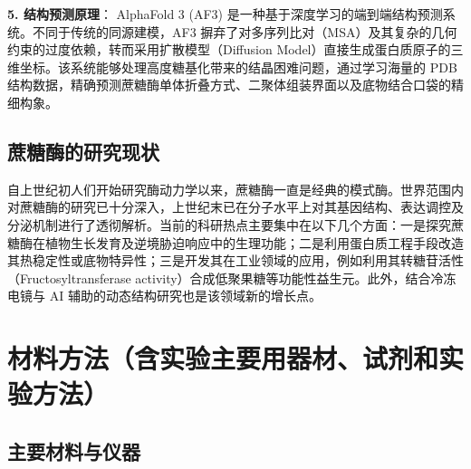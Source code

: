 \documentclass[10.5pt, a4paper]{ctexart}
\begin{document}
\textbf{5. 结构预测原理}：
AlphaFold 3 (AF3) 是一种基于深度学习的端到端结构预测系统。不同于传统的同源建模，AF3 摒弃了对多序列比对（MSA）及其复杂的几何约束的过度依赖，转而采用扩散模型（Diffusion Model）直接生成蛋白质原子的三维坐标。该系统能够处理高度糖基化带来的结晶困难问题，通过学习海量的 PDB 结构数据，精确预测蔗糖酶单体折叠方式、二聚体组装界面以及底物结合口袋的精细构象。

\subsection{蔗糖酶的研究现状}
自上世纪初人们开始研究酶动力学以来，蔗糖酶一直是经典的模式酶。世界范围内对蔗糖酶的研究已十分深入，上世纪末已在分子水平上对其基因结构、表达调控及分泌机制进行了透彻解析。当前的科研热点主要集中在以下几个方面：一是探究蔗糖酶在植物生长发育及逆境胁迫响应中的生理功能；二是利用蛋白质工程手段改造其热稳定性或底物特异性；三是开发其在工业领域的应用，例如利用其转糖苷活性（Fructosyltransferase activity）合成低聚果糖等功能性益生元。此外，结合冷冻电镜与 AI 辅助的动态结构研究也是该领域新的增长点。

\section{材料方法（含实验主要用器材、试剂和实验方法）}

\subsection{主要材料与仪器}
\end{document}
